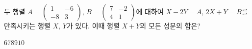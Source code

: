 \hspace*{2mm}\begin{minipage}[t]{\dimexpr\linewidth-2mm\relax}\vspace{0pt}
두 행렬 $A=\begin{pmatrix} 1 & -6 \\ -8 & 3 \end{pmatrix}$, $B=\begin{pmatrix} 7 & -2 \\ 4 & 1 \end{pmatrix}$에 대하여 $X-2Y=A$, $2X+Y=B$를 만족시키는 행렬 $X$, $Y$가 있다. 이때 행렬 $X+Y$의 모든 성분의 합은?
\begin{choices32}{$6$}{$7$}{$8$}{$9$}{$10$}\end{choices32}\end{minipage}
